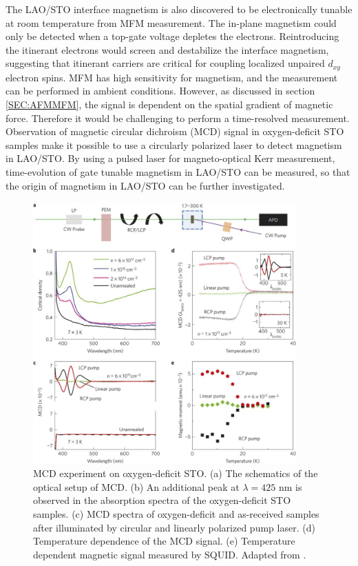 \documentclass[pdflatex, sectionletters, 12pt, final, phd]{pittetd}    %
\begin{document}
The LAO/STO interface magnetism is also discovered to be electronically tunable at room temperature from MFM measurement\cite{bi2014room}. The in-plane magnetism could only be detected when a top-gate voltage depletes the electrons. Reintroducing the itinerant electrons would screen and destabilize the interface magnetism, suggesting that itinerant carriers are critical for coupling localized unpaired $d_{xy}$ electron spins\cite{fidkowski2013magnetic, Joshua2013gate, banerjee2013ferromagnetic}. MFM has high sensitivity for magnetism, and the measurement can be performed in ambient conditions. However, as discussed in section \ref{SEC:AFMMFM}, the signal is dependent on the spatial gradient of magnetic force. Therefore it would be challenging to perform a time-resolved measurement. Observation of magnetic circular dichroism (MCD) signal in oxygen-deficit STO samples\cite{rice2014persistent} make it possible to use a circularly polarized laser to detect magnetism in LAO/STO. By using a pulsed laser for magneto-optical Kerr measurement, time-evolution of gate tunable magnetism in LAO/STO can be measured, so that the origin of magnetism in LAO/STO can be further investigated.

\begin{figure}[p]
	\centering
	\includegraphics[width=0.9\textwidth]{Drawing/MCDRice.jpg}
	\caption[MCD experiment on oxygen-deficit STO]{MCD experiment on oxygen-deficit STO. (a) The schematics of the optical setup of MCD. (b) An additional peak at $\lambda=425$ nm is observed in the absorption spectra of the oxygen-deficit STO samples. (c) MCD spectra of oxygen-deficit and as-received samples after illuminated by circular and linearly polarized pump laser. (d) Temperature dependence of the MCD signal. (e) Temperature dependent magnetic signal measured by SQUID. Adapted from \cite{rice2014persistent}.}
	\label{FIG:MCDRice}
\end{figure}
\end{document}
